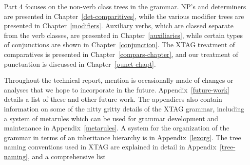 Part 4 focuses on the non-verb class trees in the grammar.  NP's and 
determiners are presented in Chapter~\ref{det-comparitives}, while the 
various modifier trees are presented in Chapter~\ref{modifiers}.  Auxiliary 
verbs, which are classed separate from the verb classes, are presented in 
Chapter~\ref{auxiliaries}, while certain types of conjunctions are shown in 
Chapter~\ref{conjunction}.  The XTAG treatment of comparatives is presented 
in Chapter~\ref{compars-chapter}, and our treatment of punctuation is 
discussed in Chapter~\ref{punct-chapt}. 
 
Throughout the technical report, mention is occasionally made of changes or 
analyses that we hope to incorporate in the future. 
Appendix~\ref{future-work} details a list of these and other future work. 
The appendices also contain information on some of the nitty gritty details 
of the XTAG grammar, including a system of metarules which can be used for 
grammar development and maintenance in Appendix~\ref{metarules}. A system 
for the organization of the grammar in terms of an inheritance hierarchy is 
in Appendix~\ref{lexorg}. The tree naming conventions used in XTAG are 
explained in detail in Appendix~\ref{tree-naming}, and a comprehensive list 
